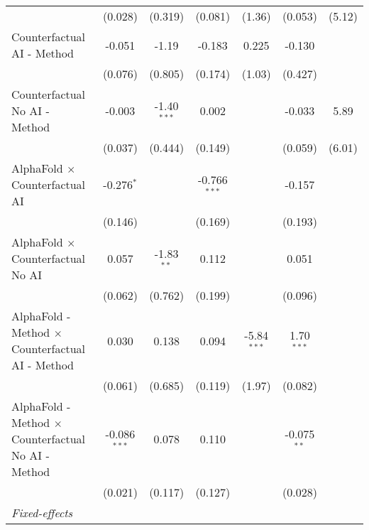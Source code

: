 \begin{tabular}{lcccccc}
                                                              & (0.028)        & (0.319)       & (0.081)        & (1.36)        & (0.053)       & (5.12)\\   
   Counterfactual AI - Method                                 & -0.051         & -1.19         & -0.183         & 0.225         & -0.130        &   \\   
                                                              & (0.076)        & (0.805)       & (0.174)        & (1.03)        & (0.427)       &   \\   
   Counterfactual No AI - Method                              & -0.003         & -1.40$^{***}$ & 0.002          &               & -0.033        & 5.89\\   
                                                              & (0.037)        & (0.444)       & (0.149)        &               & (0.059)       & (6.01)\\   
   AlphaFold $\times$ Counterfactual AI                       & -0.276$^{*}$   &               & -0.766$^{***}$ &               & -0.157        &   \\   
                                                              & (0.146)        &               & (0.169)        &               & (0.193)       &   \\   
   AlphaFold $\times$ Counterfactual No AI                    & 0.057          & -1.83$^{**}$  & 0.112          &               & 0.051         &   \\   
                                                              & (0.062)        & (0.762)       & (0.199)        &               & (0.096)       &   \\   
   AlphaFold - Method $\times$ Counterfactual AI - Method     & 0.030          & 0.138         & 0.094          & -5.84$^{***}$ & 1.70$^{***}$  &   \\   
                                                              & (0.061)        & (0.685)       & (0.119)        & (1.97)        & (0.082)       &   \\   
   AlphaFold - Method $\times$ Counterfactual No AI - Method  & -0.086$^{***}$ & 0.078         & 0.110          &               & -0.075$^{**}$ &   \\   
                                                              & (0.021)        & (0.117)       & (0.127)        &               & (0.028)       &   \\   
   \midrule
   \emph{Fixed-effects}\\

\end{tabular}
